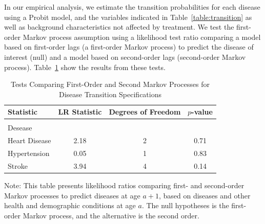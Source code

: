 \noindent In our empirical analysis, we estimate the transition probabilities for each disease using a Probit model, and the variables indicated in Table~\ref{table:transition} as well as background characteristics not affected by treatment. We test the first-order Markov process assumption using a likelihood test ratio comparing a model based on first-order lags (a first-order Markov process) to predict the disease of interest (null) and a model based on second-order lags (second-order Markov process). Table~\ref{table:lrtests} show the results from these tests. \\

\begin{table}[H]
\begin{threeparttable}
\caption{Tests Comparing First-Order and Second Markov Processes for Disease Transition Specifications} \label{table:lrtests}
\centering
\footnotesize
\begin{tabular}{lccc}
\toprule
Statistic & LR Statistic & Degrees of Freedom & $p$-value \\
\midrule \\
Desease & \\
Heart Disease & 2.18 & 2 & 0.71 \\
Hypertension   & 0.05 & 1 & 0.83 \\
Stroke              & 3.94 & 4 & 0.14 \\
\bottomrule
\end{tabular}
\begin{tablenotes}
\footnotesize
\item Note: This table presents likelihood ratios comparing first- and second-order Markov processes to predict diseases at age $a+1$, based on diseases and other health and demographic conditions at age $a$. The null hypotheses is the first-order Markov process, and the alternative is the second order.
\end{tablenotes}
\end{threeparttable}
\end{table}

